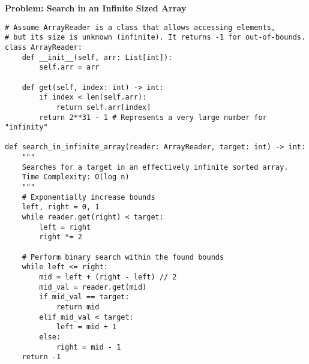 \noindent\textbf{Problem: Search in an Infinite Sized Array}
\begin{verbatim}
# Assume ArrayReader is a class that allows accessing elements,
# but its size is unknown (infinite). It returns -1 for out-of-bounds.
class ArrayReader:
    def __init__(self, arr: List[int]):
        self.arr = arr

    def get(self, index: int) -> int:
        if index < len(self.arr):
            return self.arr[index]
        return 2**31 - 1 # Represents a very large number for "infinity"

def search_in_infinite_array(reader: ArrayReader, target: int) -> int:
    """
    Searches for a target in an effectively infinite sorted array.
    Time Complexity: O(log n)
    """
    # Exponentially increase bounds
    left, right = 0, 1
    while reader.get(right) < target:
        left = right
        right *= 2

    # Perform binary search within the found bounds
    while left <= right:
        mid = left + (right - left) // 2
        mid_val = reader.get(mid)
        if mid_val == target:
            return mid
        elif mid_val < target:
            left = mid + 1
        else:
            right = mid - 1
    return -1
\end{verbatim}

